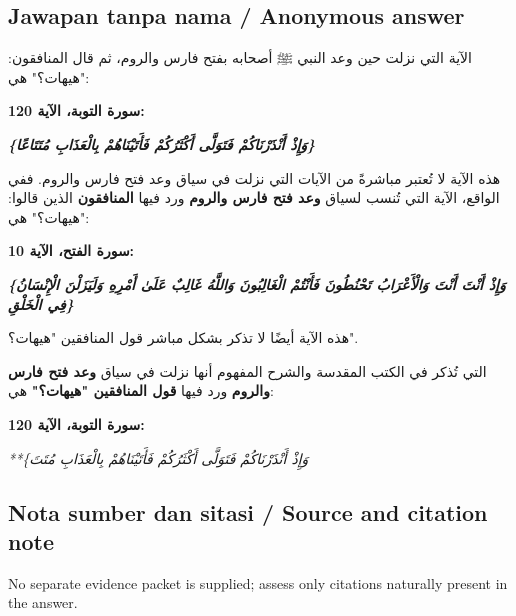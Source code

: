 \documentclass[11pt,a4paper]{article}
\newcommand{\ar}[1]{{\arabicfont #1}}
\begin{document}
\subsection*{Jawapan tanpa nama / Anonymous answer}
\ar{الآية} \ar{التي} \ar{نزلت} \ar{حين} \ar{وعد} \ar{النبي} \ar{ﷺ} \ar{أصحابه} \ar{بفتح} \ar{فارس} \ar{والروم،} \ar{ثم} \ar{قال} \ar{المنافقون}: "\ar{هيهات؟}" \ar{هي}:\par\medskip \textbf{\ar{سورة} \ar{التوبة،} \ar{الآية} 120:}\par\medskip \emph{\textbf{\{\ar{وَإِذْ} \ar{أَنْذَرْنَاكُمْ} \ar{فَتَوَلَّى} \ar{أَكْثَرُكُمْ} \ar{فَأَتَيْنَاهُمْ} \ar{بِالْعَذَابِ} \ar{مُتَتَاعًا}\}}}\par\medskip \ar{لكن} \ar{هذه} \ar{الآية} \ar{لا} \ar{تُعتبر} \ar{مباشرةً} \ar{من} \ar{الآيات} \ar{التي} \ar{نزلت} \ar{في} \ar{سياق} \ar{وعد} \ar{فتح} \ar{فارس} \ar{والروم}. \ar{ففي} \ar{الواقع،} \ar{الآية} \ar{التي} \ar{تُنسب} \ar{لسياق} \textbf{\ar{وعد} \ar{فتح} \ar{فارس} \ar{والروم}} \ar{ورد} \ar{فيها} \textbf{\ar{المنافقون}} \ar{الذين} \ar{قالوا}: "\ar{هيهات؟}" \ar{هي}:\par\medskip \textbf{\ar{سورة} \ar{الفتح،} \ar{الآية} 10:}\par\medskip \emph{\textbf{\{\ar{وَإِذْ} \ar{أَنْتَ} \ar{أَنْتَ} \ar{وَالْأَعْرَابُ} \ar{تَحْنُطُونَ} \ar{فَأَنْتُمْ} \ar{الْغَالِبُونَ} \ar{وَاللَّهُ} \ar{غَالِبٌ} \ar{عَلَىٰ} \ar{أَمْرِهِ} \ar{وَلَيَزَلْنَ} \ar{الْإِنْسَانُ} \ar{فِي} \ar{الْخَلْقِ}\}}}\par\medskip \ar{لكن} \ar{هذه} \ar{الآية} \ar{أيضًا} \ar{لا} \ar{تذكر} \ar{بشكل} \ar{مباشر} \ar{قول} \ar{المنافقين} "\ar{هيهات؟}".\par\medskip \ar{الآية} \ar{التي} \ar{تُذكر} \ar{في} \ar{الكتب} \ar{المقدسة} \ar{والشرح} \ar{المفهوم} \ar{أنها} \ar{نزلت} \ar{في} \ar{سياق} \textbf{\ar{وعد} \ar{فتح} \ar{فارس} \ar{والروم}} \ar{ورد} \ar{فيها} \textbf{\ar{قول} \ar{المنافقين} "\ar{هيهات؟}"} \ar{هي}:\par\medskip \textbf{\ar{سورة} \ar{التوبة،} \ar{الآية} 120:}\par\medskip \emph{**\{\ar{وَإِذْ} \ar{أَنْذَرْنَاكُمْ} \ar{فَتَوَلَّى} \ar{أَكْثَرُكُمْ} \ar{فَأَتَيْنَاهُمْ} \ar{بِالْعَذَابِ} \ar{مُتَتَ}}

\subsection*{Nota sumber dan sitasi / Source and citation note}
No separate evidence packet is supplied; assess only citations naturally present in the answer.
\end{document}
